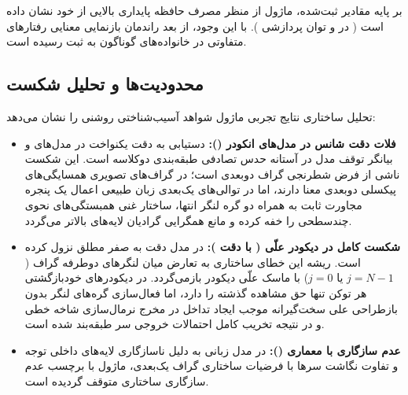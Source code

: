 بر پایه مقادیر ثبت‌شده، ماژول از منظر مصرف حافظه پایداری بالایی از خود نشان داده است ( در  و توان پردازشی ). با این وجود، از بعد راندمان بازنمایی معنایی رفتارهای متفاوتی در خانواده‌های گوناگون به ثبت رسیده است.

\subsection{محدودیت‌ها و تحلیل شکست}
تحلیل ساختاری نتایج تجربی ماژول شواهد آسیب‌شناختی روشنی را نشان می‌دهد:
\begin{itemize}
    \item \textbf{فلات دقت شانس در مدل‌های انکودر ():} دستیابی به دقت یکنواخت  در مدل‌های  و  بیانگر توقف مدل در آستانه حدس تصادفی طبقه‌بندی دوکلاسه است. این شکست ناشی از فرض شطرنجی گراف دوبعدی است؛ در گراف‌های تصویری  همسایگی‌های پیکسلی دوبعدی معنا دارند، اما در توالی‌های یک‌بعدی زبان طبیعی اعمال یک پنجره مجاورت ثابت به همراه دو گره لنگر انتها، ساختار غنی همبستگی‌های نحوی چندسطحی را خفه کرده و مانع همگرایی گرادیان لایه‌های بالاتر می‌گردد.
    \item \textbf{شکست کامل در دیکودر علّی  ( با دقت ):} در مدل  دقت به صفر مطلق نزول کرده است. ریشه این خطای ساختاری به تعارض میان لنگرهای دوطرفه گراف ($j=N-1$ یا $j=0$) با ماسک علّی دیکودر بازمی‌گردد. در دیکودرهای خودبازگشتی هر توکن تنها حق مشاهده گذشته را دارد، اما فعال‌سازی گره‌های لنگر بدون بازطراحی علی سخت‌گیرانه موجب ایجاد تداخل در مخرج نرمال‌سازی شاخه خطی و در نتیجه تخریب کامل احتمالات خروجی سر طبقه‌بند شده است.
    \item \textbf{عدم سازگاری با معماری  ():} در مدل زبانی  به دلیل ناسازگاری لایه‌های داخلی توجه و تفاوت نگاشت سرها با فرضیات ساختاری گراف یک‌بعدی، ماژول با برچسب عدم سازگاری ساختاری متوقف گردیده است.
\end{itemize}
